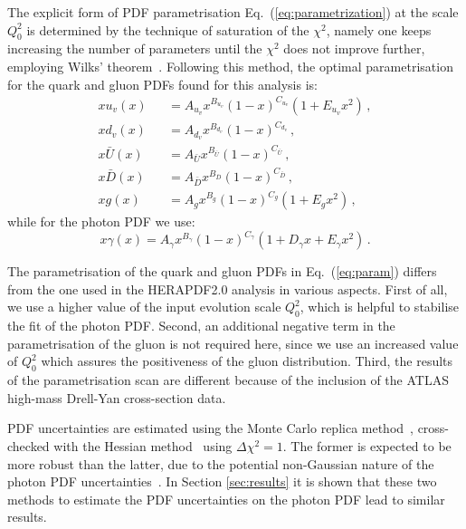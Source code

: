 The explicit form of PDF parametrisation Eq.~(\ref{eq:parametrization})
at the scale $Q_0^2$ is determined by the
technique of saturation of the $\chi^{2}$, namely one keeps increasing
the number of parameters until the $\chi^{2}$ does not improve
further, employing Wilks' theorem~\cite{Wilks:1938dza}.
%
Following this method, the optimal parametrisation for the quark and
gluon PDFs found for this analysis is:
\begin{eqnarray}
  \nonumber
  xu_v(x) &&= A_{u_v}x^{B_{u_v}}(1-x)^{C_{u_v}}(1+E_{u_v}x^{2})\, , \\
  \nonumber
xd_v(x) &&= A_{d_v}x^{B_{d_v}}(1-x)^{C_{d_v}}\, , \\
x\bar{U}(x) &&= A_{\bar{U}}x^{B_{\bar{U}}}(1-x)^{C_{\bar{U}}}\, , \\
\nonumber
x\bar{D}(x) &&= A_{\bar{D}}x^{B_{\bar{D}}}(1-x)^{C_{\bar{D}}}\, , \\
\nonumber
\label{eq:param}
xg(x) &&= A_{g}x^{B_{g}}(1-x)^{C_{g}}(1+E_{g}x^{2})\, ,
\end{eqnarray}
while for the photon PDF we use:
\begin{equation}
x\gamma(x) = A_{\gamma}x^{B_{\gamma}}(1-x)^{C_{\gamma}}(1+D_{\gamma}x+E_{\gamma}x^{2}) \, .
\end{equation}


The parametrisation of the quark and gluon PDFs in
Eq.~(\ref{eq:param}) differs from the one used in the HERAPDF2.0
analysis in various aspects.
%
First of all, we use a higher value of the input evolution scale
$Q_0^2$, which is helpful to stabilise the fit of the photon PDF.
%
Second, an additional negative term in the parametrisation of the
gluon is not required here, since we use an increased value of $Q_0^2$
which assures the positiveness of the gluon distribution.
%
Third, the results of the parametrisation scan are different because of the
inclusion of the ATLAS high-mass Drell-Yan cross-section data.

PDF uncertainties are estimated using the Monte Carlo replica
method~\cite{DelDebbio:2004xtd,DelDebbio:2007ee,Ball:2008by},
cross-checked with
the Hessian method~\cite{Pumplin:2001ct} using $\Delta\chi^2=1$.
%
The former is expected to be more robust than the latter, due to the
potential non-Gaussian nature of the photon PDF
uncertainties~\cite{Ball:2013hta}.
%
In Section \ref{sec:results} it is shown that these two methods to estimate the PDF uncertainties
on the photon PDF lead to similar results.

